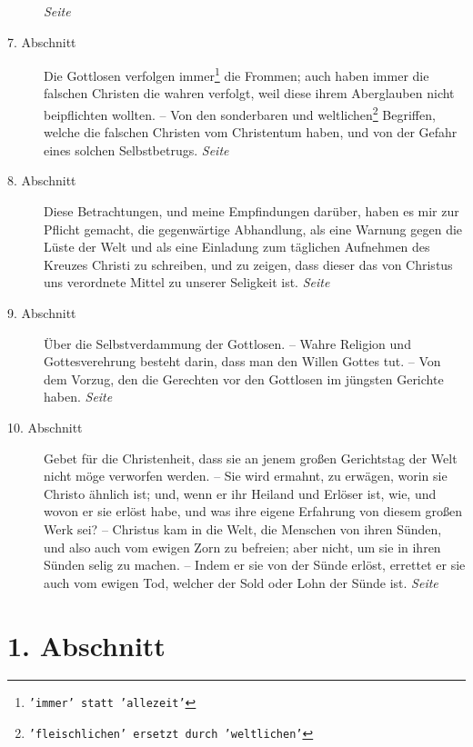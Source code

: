 \begin{description}
\dotfill \textit{Seite~\pageref{kap1_ab6}}\\
\item[7. Abschnitt] Die Gottlosen verfolgen immer\footnote{\texttt{'immer' statt
'allezeit'}} die Frommen; auch haben immer die falschen Christen die wahren
verfolgt, weil diese ihrem Aberglauben nicht beipflichten wollten. -- Von den
sonderbaren und weltlichen\footnote{\texttt{'fleischlichen' ersetzt durch 'weltlichen'}}
Begriffen, welche die falschen Christen vom
Christentum haben, und von der Gefahr eines solchen Selbstbetrugs.
\dotfill \textit{Seite~\pageref{kap1_ab7}}\\
\item[8. Abschnitt] Diese Betrachtungen, und meine Empfindungen darüber, haben
es mir zur Pflicht gemacht, die gegenwärtige Abhandlung, als eine Warnung gegen
die Lüste der Welt und als eine Einladung zum täglichen Aufnehmen des Kreuzes
Christi zu schreiben, und zu zeigen, dass dieser das von Christus uns verordnete
Mittel zu unserer Seligkeit ist.
\dotfill \textit{Seite~\pageref{kap1_ab8}}\\
\item[9. Abschnitt] Über die Selbstverdammung der Gottlosen. -- Wahre Religion
und Gottesverehrung  besteht darin, dass man den
Willen Gottes tut. -- Von dem
Vorzug, den die Gerechten vor den Gottlosen im jüngsten Gerichte haben.
\dotfill \textit{Seite~\pageref{kap1_ab9}}\\
\item[10. Abschnitt] Gebet für die Christenheit, dass sie an jenem großen
Gerichtstag der Welt nicht möge verworfen werden. -- Sie wird ermahnt, zu
erwägen, worin sie Christo ähnlich ist; und, wenn er ihr Heiland und Erlöser
ist, wie, und wovon er sie erlöst habe, und was ihre eigene Erfahrung von diesem
großen Werk sei? -- Christus kam in die Welt, die Menschen von ihren Sünden, und
also auch vom ewigen Zorn zu befreien; aber nicht, um sie in ihren Sünden selig
zu machen. -- Indem er sie von der Sünde erlöst, errettet er sie auch vom ewigen
Tod, welcher der Sold oder Lohn der Sünde ist.
\dotfill \textit{Seite~\pageref{kap1_ab10}}\\
\end{description}

\newpage

\section{1. Abschnitt} \label{kap1_ab1}

